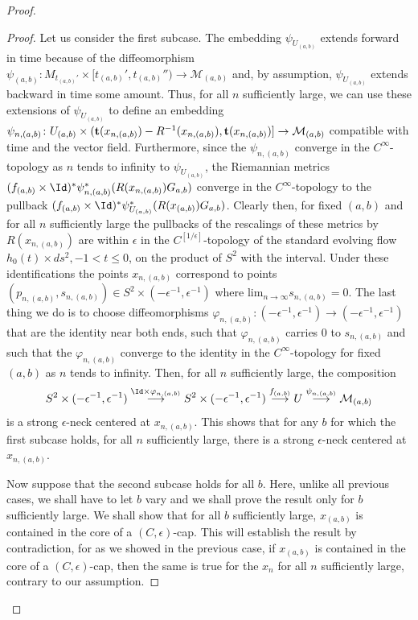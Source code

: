 \begin{proof}
\begin{proof}
Let us consider the first subcase. The embedding $\psi_{U_{(a,b)}}$
extends forward in time because of the diffeomorphism
$\psi_{(a,b)}\colon M_{t_{(a,b)}'}\times [t_{(a,b)}',t_{(a,b)}'')\to
{\mathcal M}_{(a,b)}$ and, by assumption, $\psi_{U_{(a,b)}}$ extends
backward in time some amount. Thus, for all $n$ sufficiently large,
we can use these extensions of $\psi_{U_{(a,b)}}$ to define an
embedding $\psi_{n,(a,b)}\colon U_{(a,b)}\times ({\bf
t}(x_{n,(a,b)})-R^{-1}(x_{n,(a,b)}),{\bf t}(x_{n,(a,b)})]\to
{\mathcal M}_{(a,b)}$ compatible with time and the vector field.
Furthermore, since the $\psi_{n,(a,b)}$ converge in the
$C^\infty$-topology as $n$ tends to infinity to $\psi_{U_{(a,b)}}$,
the Riemannian metrics $(f_{(a,b)}\times\Id)^*\psi_{n,(a,b)}^*(R(x_{n,(a,b)})G_{a,b})$ converge in the
$C^\infty$-topology to the pullback  $(f_{(a,b)}\times\Id)^*\psi_{U_{(a,b)}}^*(R(x_{(a,b)})G_{a,b})$. Clearly then, for
fixed $(a,b)$ and for all $n$ sufficiently large the pullbacks of
the rescalings of these metrics by $R(x_{n,(a,b)})$ are within
$\epsilon$ in the $C^{[1/\epsilon]}$-topology of the standard
evolving flow $h_0(t)\times ds^2, -1<t\le 0$, on the product of
$S^2$ with the interval. Under these identifications the points
$x_{n,(a,b)}$ correspond to points $(p_{n,(a,b)},s_{n,(a,b)})\in
S^2\times (-\epsilon^{-1},\epsilon^{-1})$ where $\mathrm{lim}_{n\rightarrow\infty}s_{n,(a,b)}=0$. The last thing we  do is
to choose diffeomorphisms $\varphi_{n,(a,b)}\colon
(-\epsilon^{-1},\epsilon^{-1})\to (-\epsilon^{-1},\epsilon^{-1})$
that are the identity near both ends, such that $\varphi_{n,(a,b)}$
carries $0$ to $s_{n,(a,b)}$ and such that the $\varphi_{n,(a,b)}$
converge to the identity in the $C^\infty$-topology for fixed
$(a,b)$ as $n$ tends to infinity. Then, for all $n$ sufficiently
large, the composition
$$S^2\times (-\epsilon^{-1},\epsilon^{-1})\stackrel{\Id\times
\varphi_{n,(a,b)}}{\longrightarrow}S^2\times
(-\epsilon^{-1},\epsilon^{-1})\stackrel{f_{(a,b)}}{\longrightarrow}
U\stackrel{\psi_{n,(a,b)}}{\longrightarrow} {\mathcal M}_{(a,b)}$$
is a strong $\epsilon$-neck centered at $x_{n,(a,b)}$. This shows that for any
$b$ for which the first subcase holds, for all $n$ sufficiently large, there is
a strong $\epsilon$-neck centered at $x_{n,(a,b)}$.

Now suppose that the second subcase holds for all $b$. Here, unlike
all previous cases, we shall have to let $b$ vary and we shall prove
the result only for $b$ sufficiently large.
We shall show that for all $b$ sufficiently large, $x_{(a,b)}$ is contained
in the core of a $(C,\epsilon)$-cap. This will establish the result by contradiction,
for as we showed in the previous case, if $x_{(a,b)}$ is contained in the core of
a $(C,\epsilon)$-cap, then the same is true for the $x_n$ for all $n$ sufficiently large,
contrary to our assumption.


\end{proof}
\end{proof}
